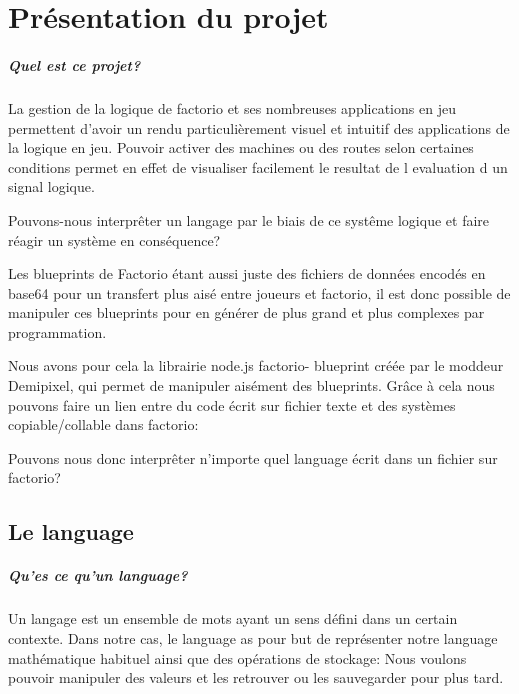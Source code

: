 \chapter{Présentation du projet}
\paragraph{Quel est ce projet?}

La gestion de la logique de factorio et ses nombreuses applications en jeu permettent d'avoir un rendu particulièrement visuel et intuitif des applications de la logique en jeu.
Pouvoir activer des machines ou des routes selon certaines conditions permet en effet de visualiser facilement le resultat de l evaluation d un signal logique.

\begin{problem}
Pouvons-nous interprêter un langage par le biais de ce systême logique et faire réagir un système en conséquence?
\end{problem}

Les blueprints de Factorio étant aussi juste des fichiers de données encodés en base64 pour un transfert plus aisé entre joueurs et factorio, il est donc possible de manipuler ces blueprints pour en générer de plus grand et plus complexes par programmation.

Nous avons pour cela la librairie node.js factorio- blueprint créée par le moddeur Demipixel, qui permet de manipuler aisément des blueprints.
Grâce à cela nous pouvons faire un lien entre du code écrit sur fichier texte et des systèmes copiable/collable dans factorio:


\begin{problem}
Pouvons nous donc interprêter n'importe quel language écrit dans un fichier sur factorio?
\end{problem}

\section{Le language}

\paragraph{Qu'es ce qu'un language?}
Un langage est un ensemble de mots ayant un sens défini dans un certain contexte.
Dans notre cas, le language as pour but de représenter notre language mathématique habituel ainsi que des opérations de stockage: Nous voulons pouvoir manipuler des valeurs et les retrouver ou les sauvegarder pour plus tard.

